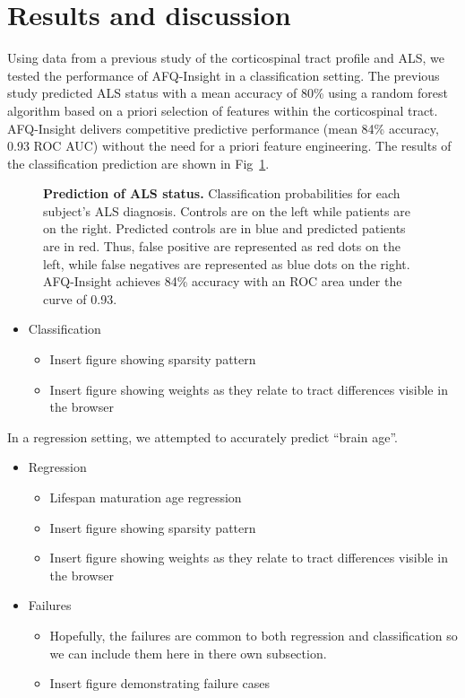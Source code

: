 \section*{Results and discussion}

Using data from a previous study of the corticospinal tract profile and ALS\cite{sarica2017corticospinal}, we tested the performance of AFQ-Insight in a classification setting. The previous study predicted ALS status with a mean accuracy of 80\% using a random forest algorithm based on a priori selection of features within the corticospinal tract. AFQ-Insight delivers competitive predictive performance (mean 84\% accuracy, 0.93 ROC AUC) without the need for a priori feature engineering. The results of the classification prediction are shown in Fig~\ref{fig:class-results}.

\begin{figure}[!h]
    \centering
    \caption{{\bf Prediction of ALS status.}
        Classification probabilities for each subject's ALS diagnosis. Controls are on the left while patients are on the right. Predicted controls are in blue and predicted patients are in red. Thus, false positive are represented as red dots on the left, while false negatives are represented as blue dots on the right. AFQ-Insight achieves 84\% accuracy with an ROC area under the curve of 0.93.
    }
    \label{fig:class-results}
\end{figure}

\begin{itemize}
  \item Classification
    \begin{itemize}
      \item Insert figure showing sparsity pattern
      \item Insert figure showing weights as they relate to tract differences visible in the browser
    \end{itemize}
\end{itemize}

In a regression setting, we attempted to accurately predict ``brain age''.

\begin{itemize}
  \item Regression
    \begin{itemize}
      \item Lifespan maturation age regression
      \item Insert figure showing sparsity pattern
      \item Insert figure showing weights as they relate to tract differences visible in the browser
    \end{itemize}
  \item Failures
    \begin{itemize}
      \item Hopefully, the failures are common to both regression
        and classification so we can include them here in there own
        subsection.
      \item Insert figure demonstrating failure cases
    \end{itemize}
\end{itemize}
